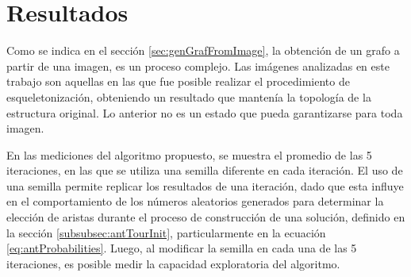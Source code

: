 \chapter{Resultados}
\label{chap:res}

Como se indica en el secci\'on \ref{sec:genGrafFromImage}, la obtenci\'on de un grafo a partir de una imagen, es un proceso complejo. Las im\'agenes analizadas en este trabajo son aquellas en las que fue posible realizar el procedimiento de esqueletonizaci\'on, obteniendo un resultado que manten\'ia la topolog\'ia de la estructura original. Lo anterior no es un estado que pueda garantizarse para toda imagen. 






En las mediciones del algoritmo propuesto, se muestra el promedio de las 5 iteraciones, en las que se utiliza una semilla diferente en cada iteraci\'on. El uso de una semilla permite replicar los resultados de una iteraci\'on, dado que esta influye en el comportamiento de los n\'umeros aleatorios generados para determinar la elecci\'on de aristas durante el proceso de construcci\'on de una soluci\'on, definido en la secci\'on \ref{subsubsec:antTourInit}, particularmente en la ecuaci\'on \ref{eq:antProbabilities}. Luego, al modificar la semilla en cada una de las 5 iteraciones, es posible medir la capacidad exploratoria del algoritmo. 

